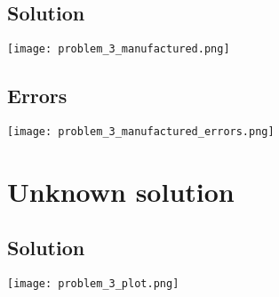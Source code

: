 \documentclass{report}
\begin{document}
\subsection*{Solution}

\texttt{[image: problem\_3\_manufactured.png]}

\subsection*{Errors}
\texttt{[image: problem\_3\_manufactured\_errors.png]}


\section*{Unknown solution}
\subsection*{Solution}
\texttt{[image: problem\_3\_plot.png]}
\end{document}
